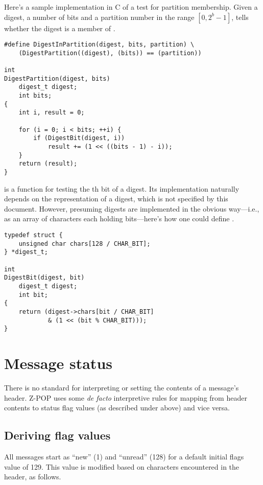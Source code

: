 Here's a sample implementation in C of a test for partition
membership.  Given a digest, a number of bits  and a partition
number  in the range $[0,{2^b}-1]$, 
tells whether the digest is a member of .

\begin{verbatim}
#define DigestInPartition(digest, bits, partition) \
    (DigestPartition((digest), (bits)) == (partition))

int
DigestPartition(digest, bits)
    digest_t digest;
    int bits;
{
    int i, result = 0;

    for (i = 0; i < bits; ++i) {
        if (DigestBit(digest, i))
            result += (1 << ((bits - 1) - i));
    }
    return (result);
}
\end{verbatim}

 is a function for testing the th bit of a
digest.  Its implementation naturally depends on the representation of
a digest, which is not specified by this document.  However, presuming
digests are implemented in the obvious way---i.e., as an array of
characters each holding \code{CHAR\_BIT} bits---here's how one could
define \code{DigestBit}.

\begin{verbatim}
typedef struct {
    unsigned char chars[128 / CHAR_BIT];
} *digest_t;

int
DigestBit(digest, bit)
    digest_t digest;
    int bit;
{
    return (digest->chars[bit / CHAR_BIT]
            & (1 << (bit % CHAR_BIT)));
}
\end{verbatim}

\section{Message status}
\label{sec:status}

There is no standard for interpreting or setting the contents of a
message's  header.  Z-POP uses some {\it de facto}
interpretive rules for mapping from \code{Status} header contents to
status flag values (as described under \code{ZSTS} above) and vice
versa.

\subsection{Deriving flag values}

All messages start as ``new'' (1) and ``unread'' (128) for a default
initial flags value of 129.  This value is modified based on
characters encountered in the  header, as follows.

